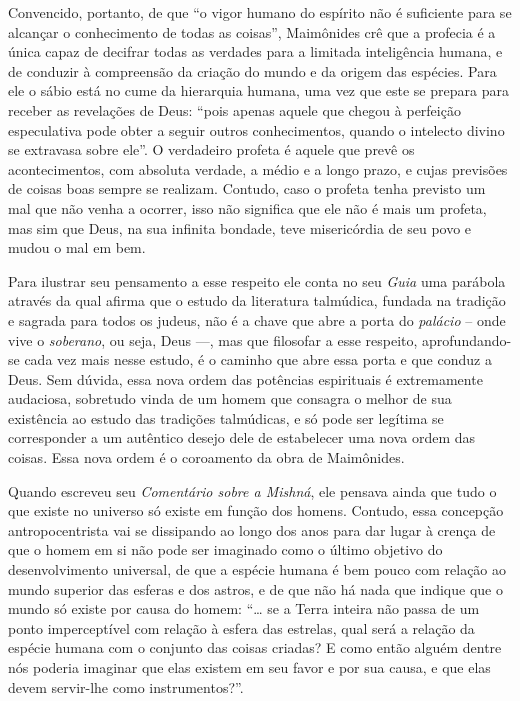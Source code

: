 Convencido, portanto, de que ``o vigor humano do espírito não é
suficiente para se alcançar o conhecimento de todas as coisas'',
Maimônides crê que a profecia é a única capaz de decifrar todas as
verdades para a limitada inteligência humana, e de conduzir à
compreensão da criação do mundo e da origem das espécies. Para ele o
sábio está no cume da hierarquia humana, uma vez que este se prepara
para receber as revelações de Deus: ``pois apenas aquele que chegou à
perfeição especulativa pode obter a seguir outros conhecimentos, quando
o intelecto divino se extravasa sobre ele''. O verdadeiro profeta é
aquele que prevê os acontecimentos, com absoluta verdade, a médio e a
longo prazo, e cujas previsões de coisas boas sempre se realizam.
Contudo, caso o profeta tenha previsto um mal que não venha a ocorrer,
isso não significa que ele não é mais um profeta, mas sim que Deus, na
sua infinita bondade, teve misericórdia de seu povo e mudou o mal em
bem.

Para ilustrar seu pensamento a esse respeito ele conta no seu
\emph{Guia} uma parábola através da qual afirma que o estudo da
literatura talmúdica, fundada na tradição e sagrada para todos os
judeus, não é a chave que abre a porta do \emph{palácio} -- onde vive o
\emph{soberano}, ou seja, Deus ---, mas que filosofar a esse respeito,
aprofundando-se cada vez mais nesse estudo, é o caminho que abre essa
porta e que conduz a Deus. Sem dúvida, essa nova ordem das potências
espirituais é extremamente audaciosa, sobretudo vinda de um homem que
consagra o melhor de sua existência ao estudo das tradições talmúdicas,
e só pode ser legítima se corresponder a um autêntico desejo dele de
estabelecer uma nova ordem das coisas. Essa nova ordem é o coroamento
da obra de Maimônides.

Quando escreveu seu \emph{Comentário sobre a Mishná}, ele pensava ainda
que tudo o que existe no universo só existe em função dos homens.
Contudo, essa concepção antropocentrista vai se dissipando ao longo dos
anos para dar lugar à crença de que o homem em si não pode ser imaginado
como o último objetivo do desenvolvimento universal, de que a espécie
humana é bem pouco com relação ao mundo superior das esferas e dos
astros, e de que não há nada que indique que o mundo só existe por causa
do homem: ``\ldots{} se a Terra inteira não passa de um ponto imperceptível
com relação à esfera das estrelas, qual será a relação da espécie
humana com o conjunto das coisas criadas? E como então alguém dentre nós
poderia imaginar que elas existem em seu favor e por sua causa, e que
elas devem servir-lhe como instrumentos?''.

